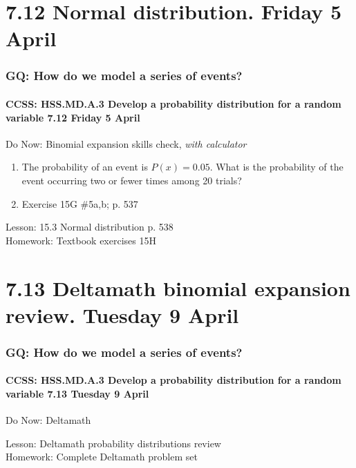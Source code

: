 \documentclass{beamer}
\begin{document}
\section{7.12 Normal distribution. Friday 5 April}
  \frame
  {
    \frametitle{GQ: How do we model a series of events?}
    \framesubtitle{CCSS: HSS.MD.A.3 Develop a probability distribution for a random variable \hfill \alert{7.12 Friday 5 April}}

    \begin{block}{Do Now: Binomial expansion skills check, \emph{with calculator}}
    \begin{enumerate}
      \item The probability of an event is $P(x)=0.05$. What is the probability of the event occurring two or fewer times among 20 trials?
      \item Exercise 15G \#5a,b; p. 537
    \end{enumerate}
    \end{block}
    Lesson: 15.3 Normal distribution p. 538\\
    Homework: Textbook exercises 15H
  }

\section{7.13 Deltamath binomial expansion review. Tuesday 9 April}
  \frame
  {
    \frametitle{GQ: How do we model a series of events?}
    \framesubtitle{CCSS: HSS.MD.A.3 Develop a probability distribution for a random variable \hfill \alert{7.13 Tuesday 9 April}}

    \begin{block}{Do Now: Deltamath}
    \end{block}

    Lesson: Deltamath probability distributions review\\
    Homework: Complete Deltamath problem set
  }
\end{document}
